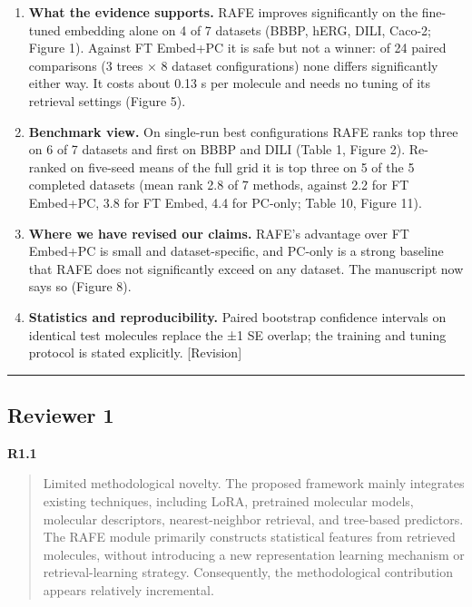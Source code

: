 \documentclass[
  10pt,
]{article}
\providecommand{\tightlist}{%
  \setlength{\itemsep}{0pt}\setlength{\parskip}{0pt}}
\begin{document}
\begin{enumerate}
\def\labelenumi{\arabic{enumi}.}
\tightlist
\item
  \textbf{What the evidence supports.} RAFE improves significantly on
  the fine-tuned embedding alone on 4 of 7 datasets (BBBP, hERG, DILI,
  Caco-2; Figure 1). Against FT Embed+PC it is safe but not a winner: of
  24 paired comparisons (3 trees × 8 dataset configurations) none
  differs significantly either way. It costs about 0.13 s per molecule
  and needs no tuning of its retrieval settings (Figure 5).
\item
  \textbf{Benchmark view.} On single-run best configurations RAFE ranks
  top three on 6 of 7 datasets and first on BBBP and DILI (Table 1,
  Figure 2). Re-ranked on five-seed means of the full grid it is top
  three on 5 of the 5 completed datasets (mean rank 2.8 of 7 methods,
  against 2.2 for FT Embed+PC, 3.8 for FT Embed, 4.4 for PC-only; Table
  10, Figure 11).
\item
  \textbf{Where we have revised our claims.} RAFE's advantage over FT
  Embed+PC is small and dataset-specific, and PC-only is a strong
  baseline that RAFE does not significantly exceed on any dataset. The
  manuscript now says so (Figure 8).
\item
  \textbf{Statistics and reproducibility.} Paired bootstrap confidence
  intervals on identical test molecules replace the ±1 SE overlap; the
  training and tuning protocol is stated explicitly. {[}Revision{]}
\end{enumerate}

\begin{center}\rule{0.5\linewidth}{0.5pt}\end{center}

\hypertarget{reviewer-1}{%
\subsection{Reviewer 1}\label{reviewer-1}}

\textbf{R1.1}

\begin{quote}
Limited methodological novelty. The proposed framework mainly integrates
existing techniques, including LoRA, pretrained molecular models,
molecular descriptors, nearest-neighbor retrieval, and tree-based
predictors. The RAFE module primarily constructs statistical features
from retrieved molecules, without introducing a new representation
learning mechanism or retrieval-learning strategy. Consequently, the
methodological contribution appears relatively incremental.
\end{quote}
\end{document}
